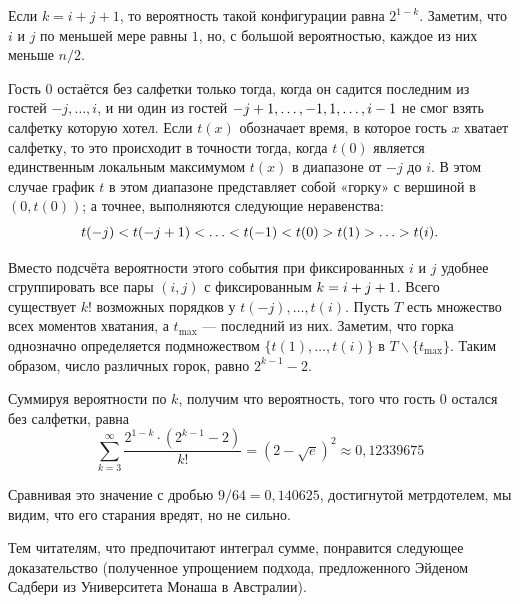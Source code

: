 Если $k = i+j+1$, то вероятность такой конфигурации равна $2^{1-k}$.
Заметим, что $i$ и $j$ по меньшей мере равны $1$, но, с большой вероятностью, каждое из них меньше $n/2$.

Гость $0$ остаётся без салфетки только тогда, когда он садится последним из гостей $-j,\dots,i$, и ни один из гостей $-j\z+1,\z\dots,-1,1,\dots,i-1$ не смог взять салфетку которую хотел.
Если $t(x)$ обозначает время, в которое гость $x$ хватает салфетку, то это происходит в точности тогда, когда $t(0)$ является единственным локальным максимумом $t(x)$ в диапазоне от $-j$ до $i$.
В этом случае график $t$ в этом диапазоне представляет собой «горку» с вершиной в $(0,t(0))$; 
а точнее, выполняются следующие неравенства: 
\[t(-j)\z<t(-j+1) \z<\z\dots\z<t(-1)\z<t(0)\z>t(1)\z>\z\dots\z>t(i).\]

Вместо подсчёта вероятности этого события при фиксированных $i$ и $j$ удобнее сгруппировать все пары $(i, j)$ с фиксированным $k=i\z+j+1$.
Всего существует $k!$ возможных порядков у $t(- j),\dots, t (i)$.
Пусть $T$ есть множество всех моментов хватания, а $t_{{\max}}$ --- последний из них. 
Заметим, что горка однозначно определяется подмножеством $\{t(1),\dots,t(i)\}$ в $T\backslash \{t_{{\max}}\}$.
Таким образом, число различных горок, равно $2^{k-1}-2$.

Суммируя вероятности по $k$, получим что вероятность, того что гость 0 остался без салфетки, равна
\[\sum_{k=3}^\infty\frac{2^{1-k}\cdot(2^{k-1}-2)}{k!}=(2-\sqrt{e})^2\approx 0{,}12339675\]
\heart

Сравнивая это значение с дробью $9/64 = 0{,}140625$, достигнутой метрдотелем, мы видим, что его старания вредят, но не сильно.

\medskip

Тем читателям, что предпочитают интеграл сумме, понравится следующее доказательство (полученное упрощением подхода, предложенного Эйденом Садбери из Университета Монаша в Австралии).

